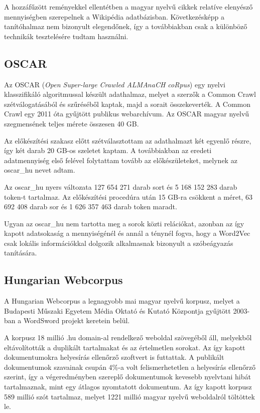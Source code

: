 A hozzáfűzött reményekkel ellentétben a magyar nyelvű cikkek relatíve elenyésző mennyiségben szerepelnek a Wikipédia adatbázisban. Következésképp a tanítóhalmaz nem bizonyult elegendőnek, így a továbbiakban csak a különböző technikák tesztelésére tudtam használni.


\subsection{OSCAR}

Az OSCAR (\textit{Open Super-large Crawled ALMAnaCH coRpus}) egy nyelvi klasszifikáló algoritmussal készült adathalmaz, melyet a szerzők a Common Crawl szétválogatásából és szűréséből kaptak, majd a sorait összekeverték. A Common Crawl egy 2011 óta gyűjtött publikus webarchívum. Az OSCAR magyar nyelvű szegmensének teljes mérete összesen 40 GB. 

Az előkészítési szakasz előtt szétválasztottam az adathalmazt két egyenlő részre, így két darab 20 GB-os szeletet kaptam. A továbbiakban az eredeti adatmennyiség első felével folytattam tovább az előkészületeket, melynek az oscar\_hu nevet adtam.

Az oscar\_hu nyers változata 127 654 271 darab sort és 5 168 152 283 darab token-t tartalmaz. Az előkészítési procedúra után 15 GB-ra csökkent a méret, 63 692 408 darab sor és 1 626 357 463 darab token maradt.

Ugyan az oscar\_hu nem tartotta meg a sorok közti relációkat, azonban az így kapott adatsokaság a mennyiségénél és annál a ténynél fogva, hogy a Word2Vec csak lokális információkkal dolgozik alkalmasnak bizonyult a szóbeágyazás tanítására.

\subsection{Hungarian Webcorpus}

A Hungarian Webcorpus a legnagyobb mai magyar nyelvű korpusz, melyet a Budapesti Műszaki Egyetem Média Oktató és Kutató Központja gyűjtött 2003-ban a WordSword projekt keretein belül.

A korpusz 18 millió .hu domain-al rendelkező weboldal szövegéből áll, melyekből eltávolították a duplikált tartalmakat és az értelmetlen sorokat. Az így kapott dokumentumokra helyesírás ellenőrző szoftvert is futtattak. A publikált dokumentumok szavainak csupán 4\%-a volt felismerhetetlen a helyesírás ellenőrző szerint, így a végeredményben szereplő dokumentumok kevesebb nyelvtani hibát tartalmaznak, mint egy átlagos nyomtatott dokumentum. Az így kapott korpusz 589 millió szót tartalmaz, melyet 1221 millió magyar nyelvű weboldalról töltöttek le.

